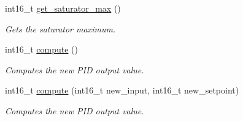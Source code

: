 \begin{DoxyCompactItemize}
int16\-\_\-t \hyperlink{classpid_afc073a6a9f5cbd1b01946b83d68a3a04}{get\-\_\-saturator\-\_\-max} ()
\begin{DoxyCompactList}\small\item\em Gets the saturator maximum. \end{DoxyCompactList}\item 
int16\-\_\-t \hyperlink{classpid_afa843ac964cf25eded9d2a80ef2b9ceb}{compute} ()
\begin{DoxyCompactList}\small\item\em Computes the new P\-I\-D output value. \end{DoxyCompactList}\item 
int16\-\_\-t \hyperlink{classpid_a3b7a6f92486d7715fbc8c52bc7c51e7c}{compute} (int16\-\_\-t new\-\_\-input, int16\-\_\-t new\-\_\-setpoint)
\begin{DoxyCompactList}\small\item\em Computes the new P\-I\-D output value. \end{DoxyCompactList}\end{DoxyCompactItemize}
